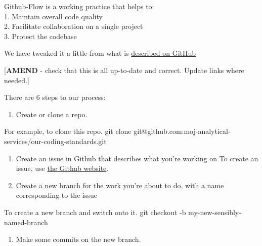 \documentclass[]{book}
\newenvironment{Shaded}{\begin{snugshade}}{\end{snugshade}}
\newcommand{\ExtensionTok}[1]{#1}
\newcommand{\FunctionTok}[1]{\textcolor[rgb]{0.00,0.00,0.00}{#1}}
\newcommand{\NormalTok}[1]{#1}
\providecommand{\tightlist}{%
  \setlength{\itemsep}{0pt}\setlength{\parskip}{0pt}}
\begin{document}
Github-Flow is a working practice that helps to:\\
1. Maintain overall code quality\\
2. Facilitate collaboration on a single project\\
3. Protect the codebase

We have tweaked it a little from what is \href{https://guides.github.com/introduction/flow/}{described on GitHub}

{[}\textbf{AMEND} - check that this is all up-to-date and correct. Update links where needed.{]}

There are 6 steps to our process:

\begin{enumerate}
\def\labelenumi{\arabic{enumi}.}
\tightlist
\item
  Create or clone a repo.
\end{enumerate}

\begin{Shaded}
\begin{Highlighting}[]
\ExtensionTok{For}\NormalTok{ example, to clone this repo.}
\FunctionTok{git}\NormalTok{ clone git@github.com:moj-analytical-services/our-coding-standards.git}
\end{Highlighting}
\end{Shaded}

\begin{enumerate}
\def\labelenumi{\arabic{enumi}.}
\setcounter{enumi}{1}
\item
  Create an issue in Github that describes what you're working on
  To create an issue, use \href{https://guides.github.com/features/issues/}{the Github website}.
\item
  Create a new branch for the work you're about to do, with a name corresponding to the issue
\end{enumerate}

\begin{Shaded}
\begin{Highlighting}[]
\ExtensionTok{To}\NormalTok{ create a new branch and switch onto it.}
\FunctionTok{git}\NormalTok{ checkout -b my-new-sensibly-named-branch}
\end{Highlighting}
\end{Shaded}

\begin{enumerate}
\def\labelenumi{\arabic{enumi}.}
\setcounter{enumi}{3}
\tightlist
\item
  Make some commits on the new branch.
\end{enumerate}
\end{document}

